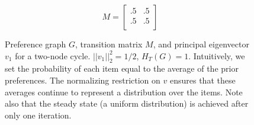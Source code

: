 \begin{figure}[!htb] %
\centering
\begin{minipage}{1.2in}
\end{minipage}
\hfill
\begin{minipage}{1.2in}
\[
M=
  \begin{bmatrix}
    .5 & .5 \\
    .5 & .5 \\
  \end{bmatrix}
\]
\end{minipage}
\hfill
\begin{minipage}{1.2in}
\end{minipage}
\caption{Preference graph $G$, transition matrix $M$, and principal eigenvector $v_1$ for a two-node cycle. $||v_1||_2^2 = 1/2$, $H_T(G) = 1$. Intuitively, we set the probability of each item equal to the average of the prior preferences. The normalizing restriction on $v$ ensures that these averages continue to represent a distribution over the items. Note also that the steady state (a uniform distribution) is achieved after only one iteration.}
\label{fig:linalg_2} 
\end{figure}



